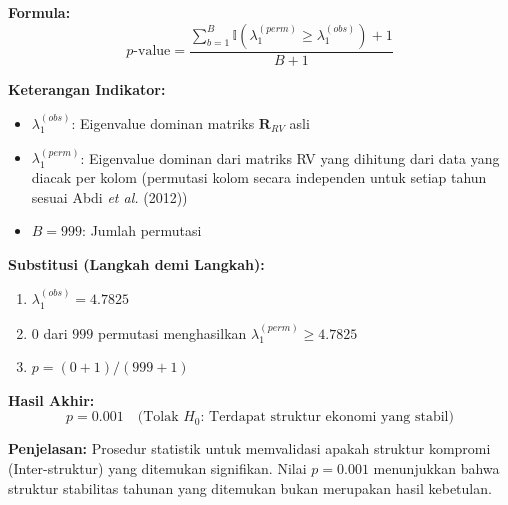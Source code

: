 \documentclass[11pt,a4paper]{article}
\begin{document}
\begin{tcolorbox}[formula_box, title={29. Uji Permutasi Stabilitas (Signifikansi)}]
\textbf{Formula:}
\[p\text{-value}=\frac{\sum_{b=1}^B\mathbb{I}(\lambda_1^{(perm)} \geq \lambda_1^{(obs)})+1}{B+1}\]

\textbf{Keterangan Indikator:}
\begin{itemize}
  \item $\lambda_1^{(obs)}$: Eigenvalue dominan matriks $\mathbf{R}_{RV}$ asli
  \item $\lambda_1^{(perm)}$: Eigenvalue dominan dari matriks RV yang dihitung dari data yang diacak per kolom (permutasi kolom secara independen untuk setiap tahun sesuai Abdi \textit{et al.} (2012))
  \item $B=999$: Jumlah permutasi
\end{itemize}

\textbf{Substitusi (Langkah demi Langkah):}
\begin{enumerate}
  \item $\lambda_1^{(obs)}=4.7825$
  \item $0$ dari $999$ permutasi menghasilkan $\lambda_1^{(perm)} \geq 4.7825$
  \item $p = (0+1)/(999+1)$
\end{enumerate}

\textbf{Hasil Akhir:}
\[ p=0.001 \quad \text{(Tolak $H_0$: Terdapat struktur ekonomi yang stabil)} \]

\textbf{Penjelasan:} Prosedur statistik untuk memvalidasi apakah struktur kompromi (Inter-struktur) yang ditemukan signifikan. Nilai $p=0.001$ menunjukkan bahwa struktur stabilitas tahunan yang ditemukan bukan merupakan hasil kebetulan.
\end{tcolorbox}
\end{document}
